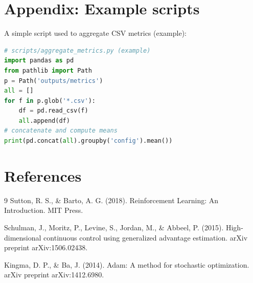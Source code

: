 \documentclass[11pt,a4paper]{article}
\begin{document}
\section{Appendix: Example scripts}
A simple script used to aggregate CSV metrics (example):
\begin{lstlisting}[language=Python]
# scripts/aggregate_metrics.py (example)
import pandas as pd
from pathlib import Path
p = Path('outputs/metrics')
all = []
for f in p.glob('*.csv'):
    df = pd.read_csv(f)
    all.append(df)
# concatenate and compute means
print(pd.concat(all).groupby('config').mean())
\end{lstlisting}

\section{References}

\begin{thebibliography}{9}
Sutton, R. S., \& Barto, A. G. (2018). Reinforcement Learning: An Introduction. MIT Press.

Schulman, J., Moritz, P., Levine, S., Jordan, M., \& Abbeel, P. (2015). High-dimensional continuous control using generalized advantage estimation. arXiv preprint arXiv:1506.02438.

Kingma, D. P., \& Ba, J. (2014). Adam: A method for stochastic optimization. arXiv preprint arXiv:1412.6980.
\end{thebibliography}
\end{document}

